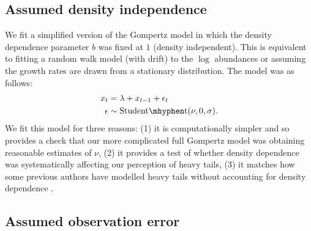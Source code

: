 \subsection{Assumed density independence}\label{assumed-density-independence}

We fit a simplified version of the Gompertz model in which the density dependence parameter $b$ was fixed at $1$ (density independent). This is equivalent to fitting a random walk model (with drift) to the $\log$ abundances or assuming the growth rates are drawn from a stationary distribution. The model was as follows:
\begin{align*}
x_t &= \lambda + x_{t-1} + \epsilon_t\\
\epsilon &\sim \mathrm{Student\mhyphen t}(\nu, 0, \sigma).
\end{align*}
We fit this model for three reasons: (1) it is computationally simpler and so provides a check that our more complicated full Gompertz model was obtaining reasonable estimates of $\nu$, (2) it provides a test of whether density dependence was systematically affecting our perception of heavy tails, (3) it matches how some previous authors have modelled heavy tails without accounting for density dependence \citep{segura2013}.

\subsection{Assumed observation error}


